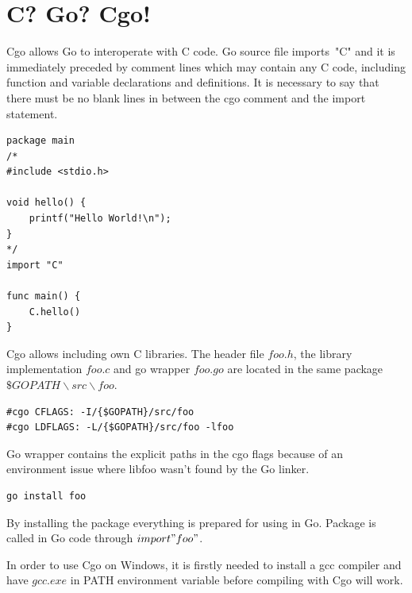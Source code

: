 \documentclass[
  digital, %
  notable,   %
  lof,     %
  lot,     %
]{fithesis3}
\begin{document}
\section{C? Go? Cgo!}\label{cgo}
Cgo allows Go to interoperate with C code. Go source file imports~"C" and it is immediately 
preceded by comment lines which may contain any C code, including function and variable 
declarations and definitions. It is necessary to say that there must be no blank lines in 
between the cgo comment and the import statement. 

\begin{lstlisting}
package main
/*
#include <stdio.h>

void hello() {
	printf("Hello World!\n");
}
*/
import "C"

func main() {
	C.hello()
}
\end{lstlisting}

Cgo allows including own C libraries. The header file $foo.h$, the library implementation 
$foo.c$ and go wrapper $foo.go$ are located in the same package $\$GOPATH\backslash 
src\backslash foo$. 
\begin{lstlisting}
#cgo CFLAGS: -I/{$GOPATH}/src/foo
#cgo LDFLAGS: -L/{$GOPATH}/src/foo -lfoo
\end{lstlisting}
Go wrapper contains the explicit paths in the cgo flags because of an environment issue where 
libfoo wasn’t found by the Go linker.
\begin{lstlisting} 
go install foo 
\end{lstlisting}
By installing the package everything is prepared for using in Go. Package is called in Go code 
through $import "foo"$.

In order to use Cgo on Windows, it is firstly needed to install a gcc compiler and have 
$gcc.exe$ in PATH environment variable before compiling with Cgo will work.

\nocite{cgo-command}
\nocite{bloggolangorg}
\nocite{cgo-wiki}
\end{document}
